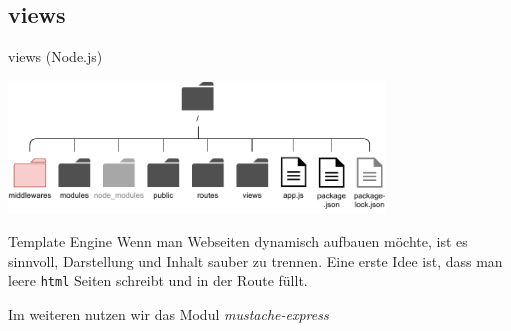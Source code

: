\subsection{views}

\begin{bonus}{views (Node.js)}
    \begin{center}
        \includegraphics[width=0.75\textwidth]{includes/figures/bonus_nodejs_middlewares.pdf}
    \end{center}
\end{bonus}

\begin{defi}{Template Engine}
    Wenn man Webseiten dynamisch aufbauen möchte, ist es sinnvoll, Darstellung und Inhalt sauber zu trennen.
    Eine erste Idee ist, dass man leere \texttt{html} Seiten schreibt und in der Route füllt.

    Im weiteren nutzen wir das Modul \emph{mustache-express}
\end{defi}

